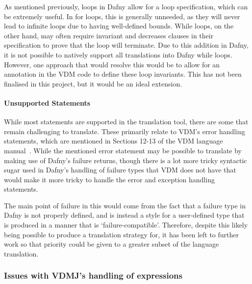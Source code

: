 \documentclass{entcs}
\begin{document}
As mentioned previously, loops in Dafny allow for a loop specification, which can be extremely useful. In for loops, this is generally unneeded, as they will never lead to infinite loops due to having well-defined bounds. While loops, on the other hand, may often require invariant and decreases clauses in their specification to prove that the loop will terminate. Due to this addition in Dafny, it is not possible to natively support all translations into Dafny while loops. However, one approach that would resolve this would be to allow for an annotation in the VDM code to define these loop invariants. This has not been finalised in this project, but it would be an ideal extension.

\paragraph{Unsupported Statements}

While most statements are supported in the translation tool, there are some that remain challenging to translate. These primarily relate to VDM's error handling statements, which are mentioned in Sections 12-13 of the VDM language manual~\cite{VDMLangMan}. While the mentioned error statement may be possible to translate by making use of Dafny's failure returns, though there is a lot more tricky syntactic sugar used in Dafny's handling of failure types that VDM does not have that would make it more tricky to handle the error and exception handling statements.

The main point of failure in this would come from the fact that a failure type in Dafny is not properly defined, and is instead a style for a user-defined type that is produced in a manner that is `failure-compatible'. Therefore, despite this likely being possible to produce a translation strategy for, it has been left to further work so that priority could be given to a greater subset of the language translation.




\subsubsection{Issues with VDMJ's handling of expressions}
\label{section:vdmj_expression_issue_unions}
\end{document}
